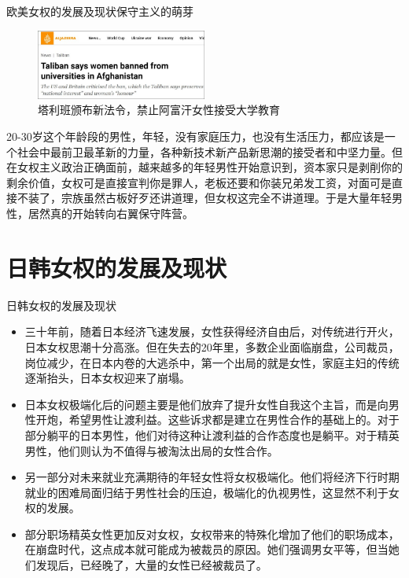 \documentclass{beamer}
\begin{document}
	\begin{frame}{欧美女权的发展及现状}{保守主义的萌芽}
		\begin{figure}
			\centering
			\includegraphics[width=0.5\textwidth]{img/图片8.jpg}
			\caption{塔利班颁布新法令，禁止阿富汗女性接受大学教育}
		\end{figure}

		20-30岁这个年龄段的男性，年轻，没有家庭压力，也没有生活压力，都应该是一个社会中最前卫最革新的力量，各种新技术新产品新思潮的接受者和中坚力量。但在女权主义政治正确面前，越来越多的年轻男性开始意识到，资本家只是剥削你的剩余价值，女权可是直接宣判你是罪人，老板还要和你装兄弟发工资，对面可是直接不装了，宗族虽然古板好歹还讲道理，但女权这完全不讲道理。于是大量年轻男性，居然真的开始转向右翼保守阵营。

	\end{frame}

	\section{日韩女权的发展及现状}
	\begin{frame}{日韩女权的发展及现状}
		\begin{itemize}
			\item 三十年前，随着日本经济飞速发展，女性获得经济自由后，对传统进行开火，日本女权思潮十分高涨。但在失去的20年里，多数企业面临崩盘，公司裁员，岗位减少，在日本内卷的大逃杀中，第一个出局的就是女性，家庭主妇的传统逐渐抬头，日本女权迎来了崩塌。
			\item 日本女权极端化后的问题主要是他们放弃了提升女性自我这个主旨，而是向男性开炮，希望男性让渡利益。这些诉求都是建立在男性合作的基础上的。对于部分躺平的日本男性，他们对待这种让渡利益的合作态度也是躺平。对于精英男性，他们则认为不值得与被淘汰出局的女性合作。
			\item 另一部分对未来就业充满期待的年轻女性将女权极端化。他们将经济下行时期就业的困难局面归结于男性社会的压迫，极端化的仇视男性，这显然不利于女权的发展。
			\item 部分职场精英女性更加反对女权，女权带来的特殊化增加了他们的职场成本，在崩盘时代，这点成本就可能成为被裁员的原因。她们强调男女平等，但当她们发现后，已经晚了，大量的女性已经被裁员了。
		\end{itemize}
	
	\end{frame}
\end{document}
